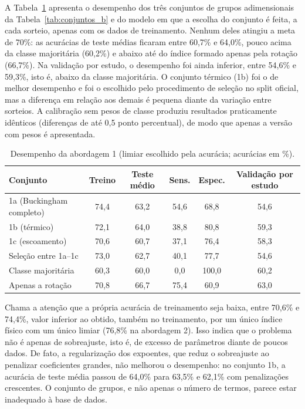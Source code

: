 \documentclass[12pt,openany]{report}
\begin{document}
A Tabela~\ref{tab:res_abord1} apresenta o desempenho dos três conjuntos de grupos adimensionais da Tabela~\ref{tab:conjuntos_b} e do modelo em que a escolha do conjunto é feita, a cada sorteio, apenas com os dados de treinamento. Nenhum deles atingiu a meta de 70\%: as acurácias de teste médias ficaram entre 60,7\% e 64,0\%, pouco acima da classe majoritária (60,2\%) e abaixo até do índice formado apenas pela rotação (66,7\%). Na validação por estudo, o desempenho foi ainda inferior, entre 54,6\% e 59,3\%, isto é, abaixo da classe majoritária. O conjunto térmico (1b) foi o de melhor desempenho e foi o escolhido pelo procedimento de seleção no split oficial, mas a diferença em relação aos demais é pequena diante da variação entre sorteios. A calibração sem pesos de classe produziu resultados praticamente idênticos (diferenças de até 0,5 ponto percentual), de modo que apenas a versão com pesos é apresentada.

\begin{table}[htbp]
\centering
\caption{Desempenho da abordagem 1 (limiar escolhido pela acurácia; acurácias em \%).}
\label{tab:res_abord1}
\small
\begin{tabular}{lccccc}
\toprule
\textbf{Conjunto} & \textbf{Treino} & \textbf{Teste médio} & \textbf{Sens.} & \textbf{Espec.} & \textbf{Validação por estudo} \\ \midrule
1a (Buckingham completo) & 74,4 & 63,2 & 54,6 & 68,8 & 54,6 \\
1b (térmico) & 72,1 & 64,0 & 38,8 & 80,8 & 59,3 \\
1c (escoamento) & 70,6 & 60,7 & 37,1 & 76,4 & 58,3 \\
Seleção entre 1a--1c & 73,0 & 62,7 & 40,1 & 77,7 & 54,6 \\ \midrule
Classe majoritária & 60,3 & 60,0 & 0,0 & 100,0 & 60,2 \\
Apenas a rotação & 70,8 & 66,7 & 75,4 & 60,9 & 63,0 \\ \bottomrule
\end{tabular}
\end{table}

Chama a atenção que a própria acurácia de treinamento seja baixa, entre 70,6\% e 74,4\%, valor inferior ao obtido, também no treinamento, por um único índice físico com um único limiar (76,8\% na abordagem 2). Isso indica que o problema não é apenas de sobreajuste, isto é, de excesso de parâmetros diante de poucos dados. De fato, a regularização dos expoentes, que reduz o sobreajuste ao penalizar coeficientes grandes, não melhorou o desempenho: no conjunto 1b, a acurácia de teste média passou de 64,0\% para 63,5\% e 62,1\% com penalizações crescentes. O conjunto de grupos, e não apenas o número de termos, parece estar inadequado à base de dados.
\end{document}
